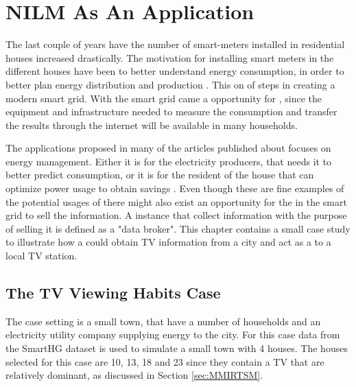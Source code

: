 \chapter{NILM As An Application} 
\label{sec:CaseStudy}
The last couple of years have the number of smart-meters installed in residential houses increased drastically. The motivation for installing smart meters in the different houses have been to better understand energy consumption, in order to better plan energy distribution and production . This on of steps in creating a modern smart grid. With the smart grid came a opportunity for , since the equipment and infrastructure needed to measure the consumption and transfer the results through the internet will be available in many households. 

The applications proposed in many of the articles published about  focuses on energy management. Either it is for the electricity producers, that needs it to better predict consumption, or it is for the resident of the house that can optimize power usage to obtain savings \citep{RefWorks:17}. Even though these are fine examples of the potential usages of  there might also exist an opportunity for the  in the smart grid to sell the  information. A instance that collect information with the purpose of selling it is defined as a "data broker". This chapter contains a small case study to illustrate how a  could obtain TV information from a city and act as a  to a local TV station. 

\section{The TV Viewing Habits Case}
The case setting is a small town, that have a number of households and an electricity utility company supplying energy to the city. For this case data from the SmartHG dataset is used to simulate a small town with 4 houses. The houses selected for this case are 10, 13, 18 and 23  since they contain a TV that are relatively dominant, as discussed in Section \ref{sec:MMIRTSM}. 

